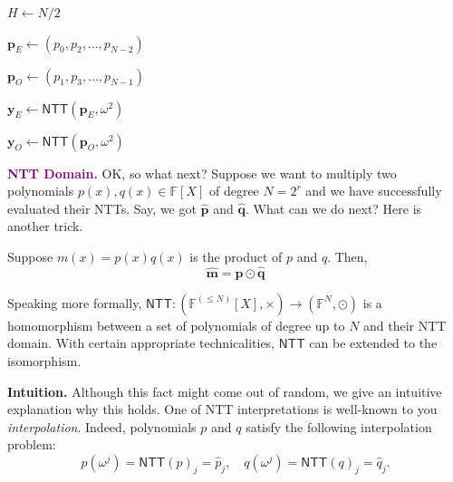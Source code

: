 \documentclass[../lecture-notes-148x210.tex]{subfiles}
\begin{document}
\begin{algorithm}[h!]
    \caption{Number Theoretic Transform (NTT)}
    \label{alg:ntt}


    $H \gets N/2$ 

    $\boldsymbol{p}_{E} \gets (p_0,p_2,\dots,p_{N-2})$ 

    $\boldsymbol{p}_{O} \gets (p_1,p_3,\dots,p_{N-1})$ 

    $\boldsymbol{y}_E \gets \mathsf{NTT}(\boldsymbol{p}_{E}, \omega^2)$ 

    $\boldsymbol{y}_O \gets \mathsf{NTT}(\boldsymbol{p}_O, \omega^2)$ 

\end{algorithm}

\textcolor{purple}{\textbf{NTT Domain.}} OK, so what next? Suppose we want to
multiply two polynomials $p(x), q(x) \in \mathbb{F}[X]$ of degree $N=2^r$ and we
have successfully evaluated their NTTs. Say, we got $\hat{\boldsymbol{p}}$ and
$\hat{\boldsymbol{q}}$. What can we do next? Here is another trick.

\begin{proposition}
    Suppose $m(x) = p(x)q(x)$ is the product of $p$ and $q$. Then,
    \begin{equation*}
        \hat{\boldsymbol{m}} = \hat{\boldsymbol{p}} \odot \hat{\boldsymbol{q}}
    \end{equation*}

    Speaking more formally, $\mathsf{NTT}: (\mathbb{F}^{(\leq N)}[X],\times) \to (\mathbb{F}^N, \odot)$ is 
    a homomorphism between a set of polynomials of degree up to $N$ and their NTT domain. With certain 
    appropriate technicalities, $\mathsf{NTT}$ can be extended to the isomorphism.
\end{proposition}

\textbf{Intuition.} Although this fact might come out of random, we give an
intuitive explanation why this holds. One of NTT interpretations is well-known to you 
\emph{interpolation}. Indeed, polynomials $p$ and $q$ satisfy the following 
interpolation problem:
\begin{equation*}
    p(\omega^j) = \mathsf{NTT}(p)_j = \hat{p}_j, \quad q(\omega^j) = \mathsf{NTT}(q)_j = \hat{q}_j.
\end{equation*}
\end{document}
